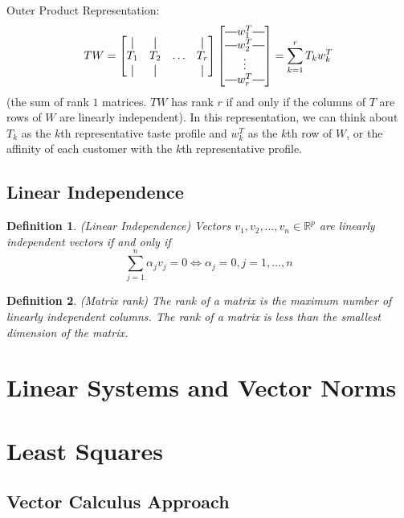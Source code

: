 \documentclass[12pt]{article}
\newtheorem{definition}{Definition}
\theoremstyle{definition}
\newcommand{\R}{\mathbb{R}}
\newcommand*{\vertbar}{\rule[-1ex]{0.5pt}{2.5ex}}
\newcommand*{\horzbar}{\rule[.5ex]{2.5ex}{0.5pt}}
\begin{document}
Outer Product Representation:
\begin{equation}
	TW = 
	\begin{bmatrix}
	\vertbar & \vertbar & & \vertbar\\
	T_1 & T_2 & \ldots & T_r \\
	\vertbar & \vertbar & & \vertbar\\	
	\end{bmatrix}
	\begin{bmatrix}
	\horzbar w_1^T \horzbar \\
	\horzbar w_2^T \horzbar \\
	\vdots \\
	\horzbar w_r^T \horzbar	
	\end{bmatrix}
	= \sum_{k=1}^r T_k w_k^T
\end{equation}
(the sum of rank $1$ matrices. $TW$ has rank $r$ if and only if the columns of $T$ are rows of $W$ are linearly independent). In this representation, we can think about $T_k$ as the $k$th representative taste profile and $w^T_k$ as the $k$th row of $W$, or the affinity of each customer with the $k$th representative profile. 

\subsection{Linear Independence}
\begin{definition}(Linear Independence)
Vectors $v_1, v_2, \ldots, v_n \in \R^p$ are linearly independent vectors if and only if
\begin{equation}
	\sum_{j=1}^n \alpha_j v_j = 0 \iff \alpha_j = 0, j=1,\ldots,n
\end{equation}	
\end{definition}

\begin{definition}(Matrix rank)
The rank of a matrix is the maximum number of linearly independent columns. The rank of a matrix is less than the smallest dimension of the matrix. 
\end{definition}


\section{Linear Systems and Vector Norms}


\section{Least Squares}
\subsection{Vector Calculus Approach}
\end{document}
